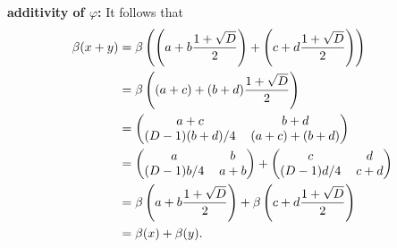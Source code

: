 \begin{enumerate}
\begin{enumerate}
               \textbf{additivity of $\varphi$:} It follows that
               \begin{align*}
                  \beta(x + y) &= \beta\left(\left(a + b
                     \frac{1 + \sqrt{D}}{2}\right) +
                     \left(c + d\frac{1 + \sqrt{D}}{2}\right)\right) \\
                     &= \beta\left((a + c) + (b + d)
                     \frac{1 + \sqrt{D}}{2}\right) \\
                     &= \left(\begin{tabular}{@{}cc@{}}
                        $a + c$ & $b + d$ \\
                        $(D-1)(b + d)/4$  & $(a + c)+(b + d)$
                     \end{tabular}\right) \\
                     &= \left(\begin{tabular}{@{}cc@{}}
                        $a$ & $b$ \\
                        $(D-1)b/4$  & $a + b$
                     \end{tabular}\right) + \left(\begin{tabular}{@{}cc@{}}
                        $c$ & $d$ \\
                        $(D-1)d/4$  & $c + d$
                     \end{tabular}\right) \\
                     &= \beta\left(a + b\frac{1 + \sqrt{D}}{2}\right) +
                        \beta\left(c + d\frac{1 + \sqrt{D}}{2}\right) \\
                     &= \beta(x) + \beta(y).
               \end{align*}


\end{enumerate}
\end{enumerate}
